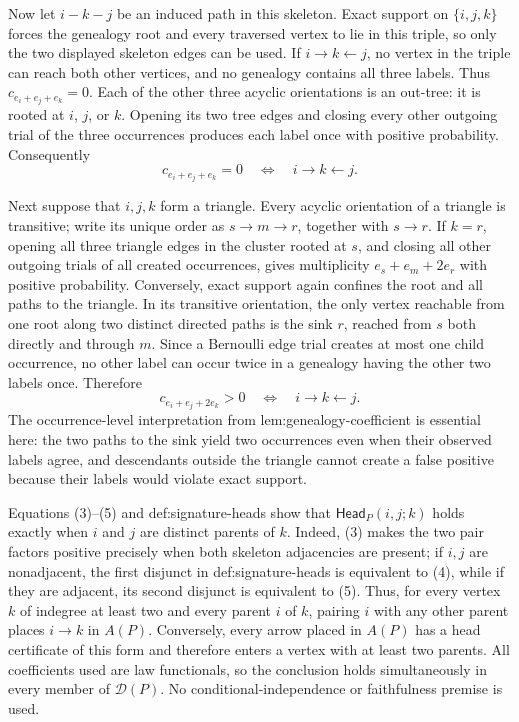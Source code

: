 Now let \(i-k-j\) be an induced path in this skeleton.  Exact support on \(\{i,j,k\}\) forces the genealogy root and every traversed vertex to lie in this triple, so only the two displayed skeleton edges can be used.  If \(i\to k\leftarrow j\), no vertex in the triple can reach both other vertices, and no genealogy contains all three labels.  Thus \(c_{e_i+e_j+e_k}=0\).  Each of the other three acyclic orientations is an out-tree: it is rooted at \(i\), \(j\), or \(k\).  Opening its two tree edges and closing every other outgoing trial of the three occurrences produces each label once with positive probability.  Consequently
\[
 c_{e_i+e_j+e_k}=0
 \quad\Longleftrightarrow\quad
 i\to k\leftarrow j.
\tag{4}
\]

Next suppose that \(i,j,k\) form a triangle.  Every acyclic orientation of a triangle is transitive; write its unique order as \(s\to m\to r\), together with \(s\to r\).  If \(k=r\), opening all three triangle edges in the cluster rooted at \(s\), and closing all other outgoing trials of all created occurrences, gives multiplicity \(e_s+e_m+2e_r\) with positive probability.  Conversely, exact support again confines the root and all paths to the triangle.  In its transitive orientation, the only vertex reachable from one root along two distinct directed paths is the sink \(r\), reached from \(s\) both directly and through \(m\).  Since a Bernoulli edge trial creates at most one child occurrence, no other label can occur twice in a genealogy having the other two labels once.  Therefore
\[
 c_{e_i+e_j+2e_k}>0
 \quad\Longleftrightarrow\quad
 i\to k\leftarrow j.
\tag{5}
\]
The occurrence-level interpretation from lem:genealogy-coefficient is essential here: the two paths to the sink yield two occurrences even when their observed labels agree, and descendants outside the triangle cannot create a false positive because their labels would violate exact support.

Equations (3)--(5) and def:signature-heads show that \(\mathsf{Head}_P(i,j;k)\) holds exactly when \(i\) and \(j\) are distinct parents of \(k\).  Indeed, (3) makes the two pair factors positive precisely when both skeleton adjacencies are present; if \(i,j\) are nonadjacent, the first disjunct in def:signature-heads is equivalent to (4), while if they are adjacent, its second disjunct is equivalent to (5).  Thus, for every vertex \(k\) of indegree at least two and every parent \(i\) of \(k\), pairing \(i\) with any other parent places \(i\to k\) in \(A(P)\).  Conversely, every arrow placed in \(A(P)\) has a head certificate of this form and therefore enters a vertex with at least two parents.  All coefficients used are law functionals, so the conclusion holds simultaneously in every member of \(\mathcal D(P)\).  No conditional-independence or faithfulness premise is used.

